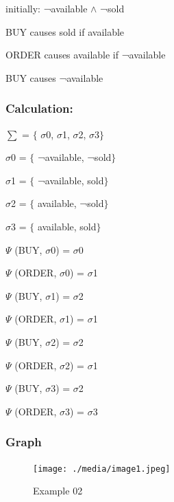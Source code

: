 \documentclass[11pt]{article}
\begin{document}
	initially: ¬available $\wedge$  ¬sold\par
	
	BUY causes sold if available\par
	
	ORDER causes available if ¬available\par
	
	BUY causes ¬available\\
	
	\subsubsection{Calculation:}\label{par:p302}
	\indent \par
	$ \sum $ = $ \{ $ $ \sigma $0, $ \sigma $1, $ \sigma $2, $ \sigma $3$ \} $ \par
	
	$ \sigma $0 = $ \{ $ ¬available, ¬sold$ \} $ \par
	
	$ \sigma $1 = $ \{ $ ¬available, sold$ \} $ \par
	
	$ \sigma $2 = $ \{ $ available, ¬sold$ \} $ \par
	
	$ \sigma $3 = $ \{ $ available, sold$ \} $ \par
	\(  \Psi  \)  (BUY, $ \sigma $0) = $ \sigma $0\par
	
	\(  \Psi  \)  (ORDER, $ \sigma $0) = $ \sigma $1\par
	
	\(  \Psi  \)  (BUY, $ \sigma $1) = $ \sigma $2\par
	
	\(  \Psi  \)  (ORDER, $ \sigma $1) = $ \sigma $1\par
	
	\(  \Psi  \)  (BUY, $ \sigma $2) = $ \sigma $2\par
	
	\(  \Psi  \)  (ORDER, $ \sigma $2) = $ \sigma $1\par
	
	\(  \Psi  \)  (BUY, $ \sigma $3) = $ \sigma $2\par
	
	\(  \Psi  \)  (ORDER, $ \sigma $3) = $ \sigma $3\par
	\subsubsection{Graph}\label{par:p402}
	\begin{figure}[H]
		\texttt{[image: ./media/image1.jpeg]}
		\label{Figure:f02}
		\caption{Example 02}
	\end{figure}
\end{document}
